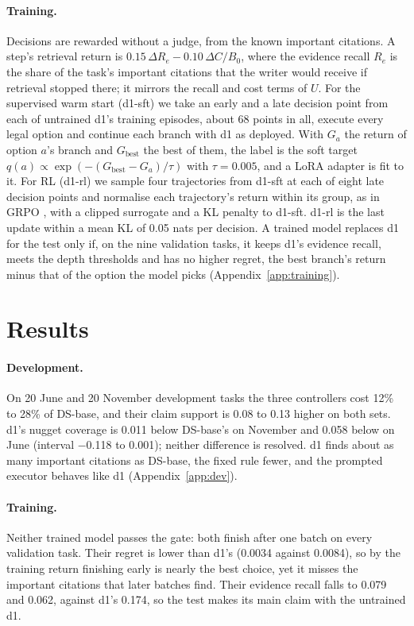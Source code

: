 \documentclass[11pt, letterpaper]{article}
\begin{document}
\paragraph{Training.} Decisions are rewarded without a judge, from the known important citations.
A step's retrieval return is $0.15\,\Delta R_e - 0.10\,\Delta C/B_0$, where the evidence recall
$R_e$ is the share of the task's important citations that the writer would receive if retrieval
stopped there; it mirrors the recall and cost terms of $U$. For the supervised warm start (d1-sft)
we take an early and a late decision point from each of untrained d1's training episodes, about 68
points in all, execute every legal option and continue each branch with d1 as deployed. With $G_a$
the return of option $a$'s branch and $G_{\text{best}}$ the best of them, the label is the soft
target $q(a) \propto \exp(-(G_{\text{best}} - G_a)/\tau)$ with $\tau = 0.005$, and a LoRA adapter
\cite{hu2022lora} is fit to it. For RL (d1-rl) we sample four trajectories from d1-sft at each of
eight late decision points and normalise each trajectory's return within its group, as in GRPO
\cite{shao2024deepseekmath}, with a clipped surrogate and a KL penalty to d1-sft. d1-rl is the last
update within a mean KL of 0.05 nats per decision. A trained model replaces d1 for the test only if,
on the nine validation tasks, it keeps d1's evidence recall, meets the depth thresholds and has no higher
regret, the best branch's return minus that of the option the model picks
(Appendix~\ref{app:training}).

\section{Results}
\label{sec:results}

\paragraph{Development.} On 20 June and 20 November development tasks the three controllers cost 12\%
to 28\% of DS-base, and their claim support is 0.08 to 0.13 higher on both sets. d1's nugget
coverage is 0.011 below DS-base's on November and 0.058 below on June (interval $-$0.118 to 0.001);
neither difference is resolved. d1 finds about as many important citations as DS-base, the fixed
rule fewer, and the prompted executor behaves like d1 (Appendix~\ref{app:dev}).

\paragraph{Training.} Neither trained model passes the gate: both finish after one batch on every
validation task. Their regret is lower than d1's (0.0034 against 0.0084), so by the training return
finishing early is nearly the best choice, yet it misses the important citations that later batches
find. Their evidence recall falls to 0.079 and 0.062, against d1's 0.174, so the test makes its main
claim with the untrained d1.
\end{document}
